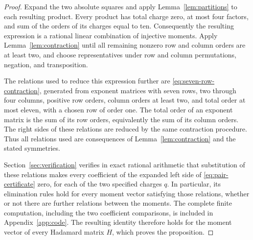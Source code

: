 \begin{proof}
Expand the two absolute squares and apply
Lemma~\ref{lem:partitions} to each resulting product.  Every product has
total charge zero, at most four factors, and sum of the orders of its
charges equal to ten.  Consequently the resulting expression is a
rational linear combination of injective moments.  Apply
Lemma~\ref{lem:contraction} until all remaining nonzero row and column
orders are at least two, and choose representatives under row and
column permutations, negation, and transposition.

The relations used to reduce this expression further are
\eqref{eq:seven-row-contraction}, generated from exponent matrices
with seven rows, two through four columns, positive row orders,
column orders at least two, and total order at most eleven, with a
chosen row of order one.  The total order of an exponent matrix is the
sum of its row orders, equivalently the sum of its column orders.
The right sides of these relations are reduced by the same contraction
procedure.  Thus all relations used are consequences of
Lemma~\ref{lem:contraction} and the stated symmetries.

Section~\ref{sec:verification} verifies in exact rational arithmetic
that substitution of these relations makes every coefficient of the
expanded left side of \eqref{eq:pair-certificate} zero, for each of the
two specified charges $q$.  In particular, its elimination rules hold
for every moment vector satisfying those relations, whether or not
there are further relations between the moments.  The complete finite
computation, including the two coefficient comparisons, is included in
Appendix~\ref{app:code}.  The resulting identity therefore holds for
the moment vector of every Hadamard matrix $H$, which proves the
proposition.
\end{proof}

